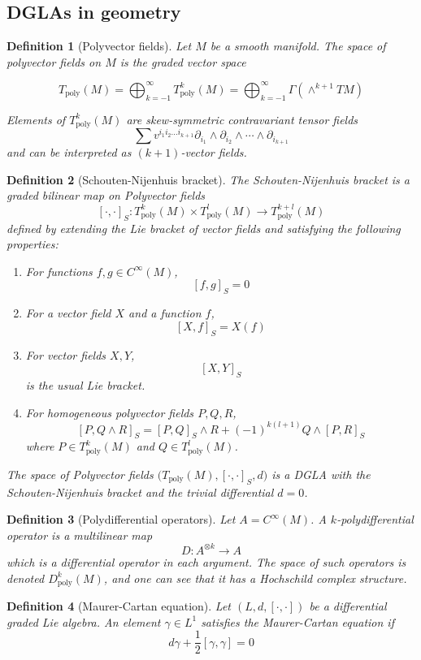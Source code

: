 \documentclass[
  12pt,
  a4paper, oneside
]{report}
\theoremstyle{bolddef}
\newtheorem{definition}{Definition}
\theoremstyle{remark}
\numberwithin{equation}{chapter}
\begin{document}
\subsection*{DGLAs in geometry}
\begin{definition}[Polyvector fields]\label{def:polyvector}
Let $M$ be a smooth manifold. The space of polyvector fields on $M$ is the graded vector space

$$
T_{\text{poly}}(M) = \bigoplus_{k=-1}^{\infty} T_{\text{poly}}^k(M) = \bigoplus_{k=-1}^{\infty} \Gamma(\wedge^{k+1} TM)
$$

Elements of $T_{\text{poly}}^k(M)$ are skew-symmetric contravariant tensor fields 
$$
\sum v^{i_{1}i_{2} \ldots i_{k+1}} \partial_{i_{1}} \wedge \partial_{i_{2}} \wedge \cdots \wedge \partial_{i_{k+1}}
$$
and can be interpreted as $(k+1)$-vector fields.
\end{definition}
\begin{definition}[Schouten-Nijenhuis bracket]
 The \textit{Schouten-Nijenhuis bracket} is a graded bilinear map on Polyvector fields
$$
[\cdot,\cdot]_S :
T_{\mathrm{poly}}^k(M)\times T_{\mathrm{poly}}^l(M)
\to T_{\mathrm{poly}}^{k+l}(M)
$$
defined by extending the Lie bracket of vector fields and satisfying the following properties:
\begin{enumerate}

\item For functions $f,g\in C^\infty(M)$,
$$
[f,g]_S=0
$$

\item For a vector field $X$ and a function $f$,
$$
[X,f]_S=X(f)
$$

\item For vector fields $X,Y$,
$$
[X,Y]_S
$$
is the usual Lie bracket.

\item For homogeneous polyvector fields $P,Q,R$,
$$
[P,Q\wedge R]_S
=
[P,Q]_S\wedge R
+
(-1)^{k(l+1)} Q\wedge [P,R]_S
$$
where $P\in T_{\mathrm{poly}}^k(M)$ and $Q\in T_{\mathrm{poly}}^l(M)$.

\end{enumerate}
The space of Polyvector fields $\big(T_{\mathrm{poly}}(M),[\cdot,\cdot]_S ,d\big)$ is a DGLA with the Schouten-Nijenhuis bracket and the trivial differential $d = 0$.

\end{definition}


\begin{definition}[Polydifferential operators]
Let $A=C^\infty(M)$. A $k$-polydifferential operator is a multilinear map
$$
D : A^{\otimes k} \to A
$$
which is a differential operator in each argument.
The space of such operators is denoted $D_{\text{poly}}^k(M)$, and one can see that it has a Hochschild complex structure.
\end{definition}
\begin{definition}[Maurer-Cartan equation] \label{def:MCeqn}
Let $(L,d,[\cdot,\cdot])$ be a differential graded Lie algebra.
An element $\gamma \in L^1$ satisfies the Maurer-Cartan equation if
$$
d\gamma + \frac12[\gamma,\gamma]=0
$$
\end{definition}
\end{document}
